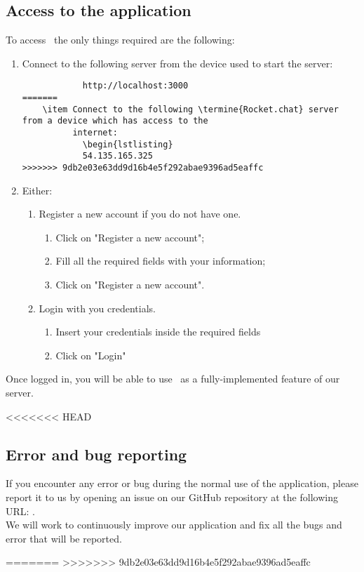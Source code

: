 \subsection{Access to the application}
To access \app\, the only things required are the following:
\begin{enumerate}
<<<<<<< HEAD
	\item Connect to the following  server from the device used to start the server:
			\begin{lstlisting}
			http://localhost:3000
=======
	\item Connect to the following \termine{Rocket.chat} server from a device which has access to the 		
		  internet:
			\begin{lstlisting}
			54.135.165.325 
>>>>>>> 9db2e03e63dd9d16b4e5f292abae9396ad5eaffc
			\end{lstlisting}
	\item Either:
		  \begin{enumerate}
		  	\item Register a new account if you do not have one.
		  		\begin{enumerate}
		  			\item Click on "Register a new account";
		  			\item Fill all the required fields with your information;
		  			\item Click on "Register a new account".
		  		\end{enumerate}
		  		
		  	\item Login with you credentials.
		  		\begin{enumerate}
		  			\item Insert your credentials inside the required fields
		  			\item Click on "Login"
		  		\end{enumerate}
		  \end{enumerate}
\end{enumerate}

Once logged in, you will be able to use \app\ as a fully-implemented feature of our server.

<<<<<<< HEAD

\subsection{Error and bug reporting}
If you encounter any error or bug during the normal use of the application, please report it to us by opening an issue on our GitHub repository at the following URL: . \\
We will work to continuously improve our application and fix all the bugs and error that will be reported. 


=======
>>>>>>> 9db2e03e63dd9d16b4e5f292abae9396ad5eaffc
\newpage